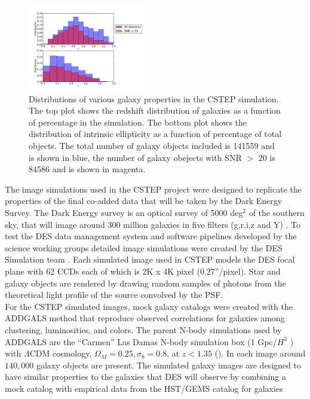 \begin{figure}
 \centering  %
  \includegraphics[width=0.45\textwidth]{fig/Out_hist_v2_truth.pdf} 
  \caption{Distributions of various galaxy 
properties in the CSTEP simulation. The top plot shows the
redshift distribution of galaxies as a function of percentage in the simulation. 
The bottom plot shows the distribution of intrinsic ellipticity as a
function of percentage of total objects. The
total number of galaxy objects included is 141559 and is shown in blue, the number of
galaxy obejects with SNR $>$ 20 is 84586 and is shown in magenta.}
\label{fig:Galprop}
\end{figure}
The image simulations used in the CSTEP project were designed to 
replicate the properties of the final co-added data that will be taken by the 
Dark Energy Survey. The Dark Energy survey is an optical survey of
5000 deg$^2$ of the southern sky, that will image around 300 million
galaxies in five filters (g,r,i,z and Y) \citep{Klaus}. To test the DES
data management system and software pipelines developed by the 
science working groups detailed image simulations were created by the 
DES Simulation team \citep{DESsim}. Each simulated image used in CSTEP models the DES focal plane
with 62 CCDs each of which is 2K x 4K pixel (0.27''/pixel). Star and galaxy objects are
rendered by drawing random samples of
photons from the theoretical light profile of the source convolved 
by the PSF. \\
\indent For the CSTEP simulated images, mock galaxy catalogs were
created with the ADDGALS  method that reproduce observed correlations
for galaxies among clustering, luminosities, and colors. 
The parent N-body simulations used by ADDGALS are the ``Carmen'' Las Damas
N-body simulation box (1 Gpc/$H^3$ ) with  $ \Lambda$CDM cosmology, $\Omega_M
= 0.25, \sigma_8 = 0.8$, at $z< 1.35 $
(\cite{LasDamas}). In each image around $ 140,000 $ galaxy objects are
present. The simulated galaxy images are designed to have similar properties to
the galaxies that DES will observe by combining a mock
catalog with empirical data from the HST/GEMS catalog for galaxies
